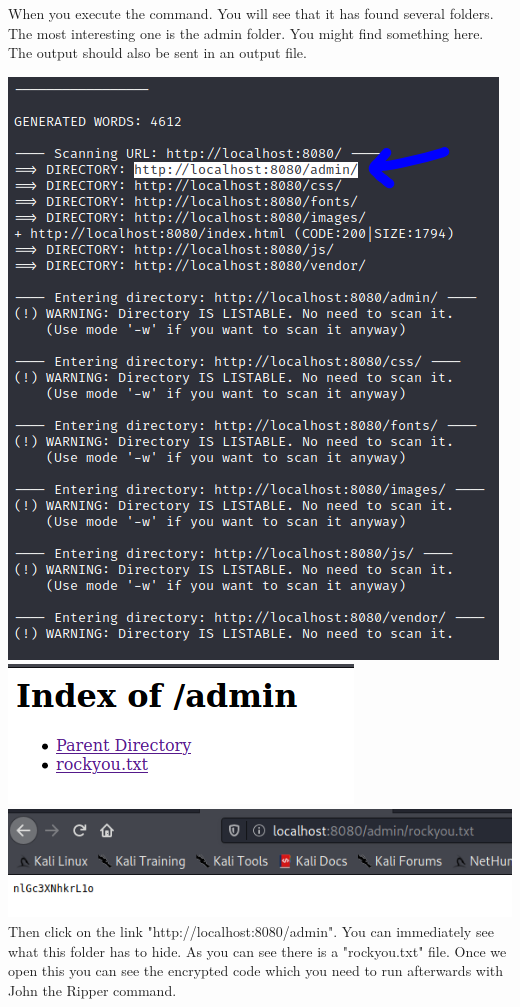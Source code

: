 \documentclass[../main.tex]{subfiles}
\begin{document}
When you execute the command. You will see that it has found several folders. The most interesting one is the admin folder. You might find something here. The output should also be sent in an output file. 

\includegraphics[width=\linewidth]{images/Boyan/challenge2_2_boyan.PNG}
\includegraphics[width=\linewidth]{images/Boyan/challenge2_5_boyan.PNG}
\includegraphics[width=\linewidth]{images/Boyan/challenge2_3_boyan.PNG}
Then click on the link "http://localhost:8080/admin". You can immediately see what this folder has to hide. As you can see there is a "rockyou.txt" file. Once we open this you can see the encrypted code which you need to run afterwards with John the Ripper command. 
\end{document}
